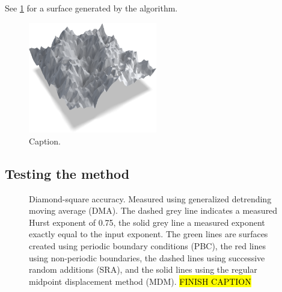 See \cref{fig:diamond_square_surface} for a surface generated by the algorithm.
%
\begin{figure}[htpb]%
    \centering%
    \includegraphics[width=0.5\textwidth]{./images/diamond_square/surface_blender/surface_composite01_cropped.png}%
    \caption{%
        Caption.%
        \label{fig:diamond_square_surface}%
    }%
\end{figure}%


\subsection{Testing the method}
%
\begin{figure}[htpb]%
    \centering%
    {
        \newcommand{\f}{\footnotesize}%
        \newcommand{\x}{\text}%
        \newcommand{\hh}{{\f $H_\x{in}=H_\x{out}$}}%
    }
    \caption{%
        Diamond-square accuracy. Measured using generalized detrending moving average (DMA). The dashed grey line indicates a measured Hurst exponent of 0.75, the solid grey line a measured exponent exactly equal to the input exponent. The green lines are surfaces created using periodic boundary conditions (PBC), the red lines using non-periodic boundaries, the dashed lines using successive random additions (SRA), and the solid lines using the regular midpoint displacement method (MDM). \hl{FINISH CAPTION} %
    }%
\end{figure}%
